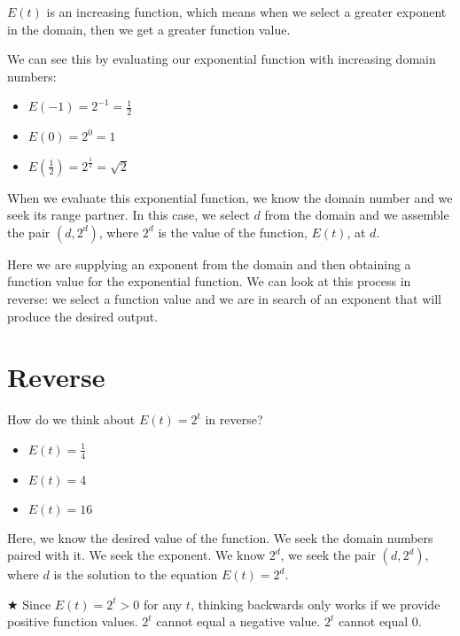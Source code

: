\documentclass{ximera}
\begin{document}
$E(t)$ is an increasing function, which means when we select a greater exponent in the domain, then we get a greater function value.  



We can see this by evaluating our exponential function with increasing domain numbers:
\begin{itemize}
\item $E(-1) = 2^{-1} = \frac{1}{2}$
\item $E(0) = 2^0 = 1$
\item $E\left(\frac{1}{2}\right) = 2^{\tfrac{1}{2}} = \sqrt{2}$
\end{itemize}


When we evaluate this exponential function, we know the domain number and we seek its range partner. In this case, we select $d$ from the domain and we assemble the pair $(d, 2^d)$, where $2^d$ is the value of the function, $E(t)$, at $d$.



Here we are supplying an exponent from the domain and then obtaining a function value for the exponential function.  We can look at this process in reverse: we select a function value and we are in search of an exponent that will produce the desired output.









\section*{Reverse}

How do we think about $E(t) = 2^t$ in reverse?
\begin{itemize}
\item $E(t) = {\tfrac{1}{4}} $
\item $E(t) = 4$
\item $E(t) = 16 $
\end{itemize}


Here, we know the desired value of the function.  We seek the domain numbers paired with it. We seek the exponent. We know $2^d$, we seek the pair $(d, 2^d)$, where $d$ is the solution to the equation $E(t) = 2^d$.




\textbf{\textcolor{red!90!darkgray}{$\bigstar$}}  Since $E(t) = 2^t > 0$ for any $t$, thinking backwards only works if we provide positive function values. $2^t$ cannot equal a negative value. $2^t$ cannot equal $0$.   \\ 
\end{document}
